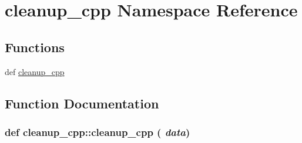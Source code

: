 \hypertarget{namespacecleanup__cpp}{
\section{cleanup\_\-cpp Namespace Reference}
\label{namespacecleanup__cpp}
}
\subsection*{Functions}
\begin{DoxyCompactItemize}
\item 
def \hyperlink{namespacecleanup__cpp_a73d819752ffd659999d765cdaa2ea60b}{cleanup\_\-cpp}
\end{DoxyCompactItemize}


\subsection{Function Documentation}
\hypertarget{namespacecleanup__cpp_a73d819752ffd659999d765cdaa2ea60b}{
\subsubsection[{cleanup\_\-cpp}]{\setlength{\rightskip}{0pt plus 5cm}def cleanup\_\-cpp::cleanup\_\-cpp ( {\em data})}}
\label{namespacecleanup__cpp_a73d819752ffd659999d765cdaa2ea60b}
